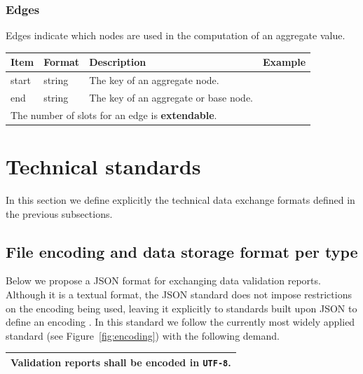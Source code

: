 \documentclass[a4paper, 11pt,titlepage]{article}
\newcommand{\code}[1]{\texttt{#1}}
\begin{document}
\subsubsection{Edges}
Edges indicate which nodes are used in the computation of an aggregate value.
\begin{center}
\begin{tabular}{|lp{}p{}p{}|}
\hline
\textbf{Item} & \textbf{Format} & \textbf{Description} &\textbf{Example}\\
\hline
start  & string & The key of an aggregate node. & \\
end    & string & The key of an aggregate or base node. & \\
\hline
\multicolumn{4}{|l|}{The number of slots for an edge is \textbf{extendable}.
}\\
\hline
\end{tabular}
\end{center}




\section{Technical standards}
In this section we define explicitly the technical data exchange
formats defined in the previous subsections.

\subsection{File encoding and data storage format per type}
Below we propose a JSON format \citep{ecma2013json} for exchanging data
validation reports.  Although it is a textual format, the JSON standard does
not impose restrictions on the encoding being used, leaving it explicitly to
standards built upon JSON to define an encoding \citep[pp ii]{ecma2013json}. In
this standard we follow the currently most widely applied standard (see
Figure~\ref{fig:encoding}) with the following demand.

\begin{center}
\label{tab:encoding}
\begin{tabular}{|p{}|}
\hline
Validation reports shall be encoded in \code{UTF-8}.\\
\hline
\end{tabular}
\end{center}
\end{document}
